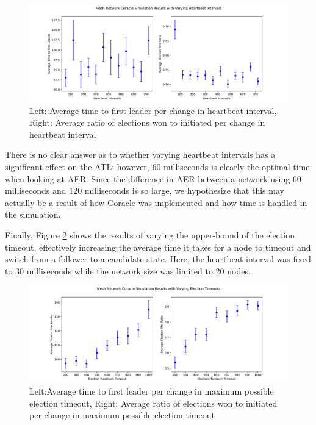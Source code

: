 \begin{figure}[H]
    \centering
    \includegraphics[width=0.9\columnwidth]{images/coracle_vary_heartbeat.png}
    \caption{Left: Average time to first leader per change in heartbeat interval, Right: Average ratio of elections won to initiated per change in heartbeat interval }
    \label{fig:coracle_vary_heartbeat}
\end{figure}

There is no clear answer as to whether varying heartbeat intervals has a significant effect on the ATL; however, 60 milliseconds is clearly the optimal time when looking at AER. Since the difference in AER between a network using 60 milliseconds and 120 milliseconds is so large, we hypothesize that this may actually be a result of how Coracle was implemented and how time is handled in the simulation.

Finally, Figure \ref{fig:coracle_vary_election_timeout} shows the results of varying the upper-bound of the election timeout, effectively increasing the average time it takes for a node to timeout and switch from a follower to a candidate state. Here, the heartbeat interval was fixed to 30 milliseconds while the network size was limited to 20 nodes.

\begin{figure}[H]
    \centering
    \includegraphics[width=0.9\columnwidth]{images/coracle_vary_election_timeout.png}
    \caption{Left:Average time to first leader per change in maximum possible election timeout, Right: Average ratio of elections won to initiated per change in maximum possible election timeout}
    \label{fig:coracle_vary_election_timeout}
\end{figure}

